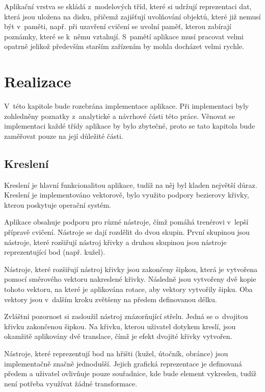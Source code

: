 \documentclass[thesis=B,czech]{FITthesis}[2012/06/26]
\begin{document}
	Aplikační vrstva se skládá z~modelových tříd, které si udržují reprezentaci dat, která jsou uložena na disku, přičemž zajišťují uvolňování objektů, které již nemusí být v~paměti, např. při uzavření cvičení se uvolní paměť, kterou zabírají poznámky, které se k~němu vztahují. S~pamětí aplikace musí pracovat velmi opatrně jelikož především starším zařízením by mohla docházet velmi rychle.

\chapter{Realizace}

	V~této kapitole bude rozebrána implementace aplikace. Při implementaci byly zohledněny poznatky z~analytické a návrhové části této práce. Věnovat se implementaci každé třídy aplikace by bylo zbytečné, proto se tato kapitola bude zaměřovat pouze na její důležité části.

	\section{Kreslení}

	Kreslení je hlavní funkcionalitou aplikace, tudíž na něj byl kladen největší důraz. Kreslení je implementováno vektorově, bylo využito podpory bezierovy křivky, kterou poskytuje operační systém.

	Aplikace obsahuje podporu pro různé nástroje, čímž pomáhá trenérovi v~lepší přípravě cvičení. Nástroje se dají rozdělit do dvou skupin. První skupinou jsou nástroje, které rozšiřují nástroj křivky a druhou skupinou jsou nástroje reprezentující bod (např. kužel).

	Nástroje, které rozšiřují nástroj křivky jsou zakončeny šipkou, která je vytvořena pomocí směrového vektoru nakreslené křivky. Následně jsou vytvořeny dvě kopie tohoto vektoru, na které je aplikována rotace, aby vektory vytvořily šipku. Oba vektory jsou v~dalším kroku zvětšeny na předem definovanou délku.

	Zvláštní pozornost si zasloužil nástroj znázorňující střelu. Jedná se o~dvojitou křivku zakončenou šipkou. Na křivku, kterou uživatel dotykem kreslí, jsou okamžitě aplikovány dvě translace, čímž je efekt dvojité křivky vytvořen.

	Nástroje, které reprezentují bod na hřišti (kužel, útočník, obránce) jsou implementačně značně jednodušší. Jejich grafická reprezentace je definovaná předem a uživatel ovlivňuje pouze souřadnice, kde bude element vykreslen, tudíž není potřeba využívat žádné transformace.
\end{document}
